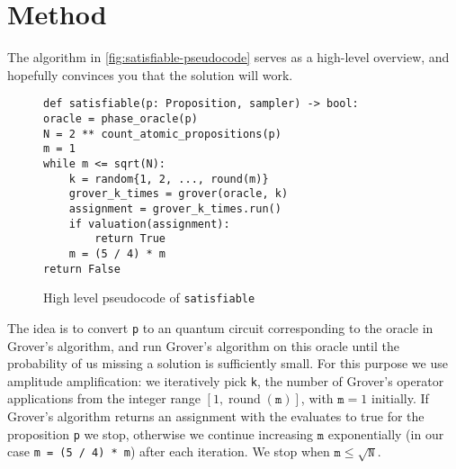\section{Method}\label{sec:method}

The algorithm in \autoref{fig:satisfiable-pseudocode} serves as a high-level overview, and hopefully convinces you that the solution will work.

\begin{figure}
\centering
\begin{verbatim}
def satisfiable(p: Proposition, sampler) -> bool:
oracle = phase_oracle(p)
N = 2 ** count_atomic_propositions(p)
m = 1
while m <= sqrt(N):
    k = random{1, 2, ..., round(m)}
    grover_k_times = grover(oracle, k)
    assignment = grover_k_times.run()
    if valuation(assignment):
        return True
    m = (5 / 4) * m
return False
\end{verbatim}
\caption{High level pseudocode of \texttt{satisfiable} }
\label{fig:satisfiable-pseudocode}
\end{figure}

The idea is to convert \texttt{p} to an quantum circuit corresponding to the oracle in Grover's algorithm, and run Grover's algorithm  on this oracle until the probability of us missing a solution is sufficiently small.
For this purpose we use amplitude amplification:
we iteratively pick \texttt{k}, the number of Grover's operator applications from the integer range $[1, \operatorname{round}(\texttt{m})]$, with $\texttt{m} = 1$ initially.
If Grover's algorithm returns an assignment with the evaluates to true for the proposition \texttt{p} we stop, otherwise we continue increasing $\texttt{m}$ exponentially (in our case \texttt{m = (5 / 4) * m}) after each iteration.
We stop when $\texttt{m} \leq \sqrt{\texttt{N}}$.
